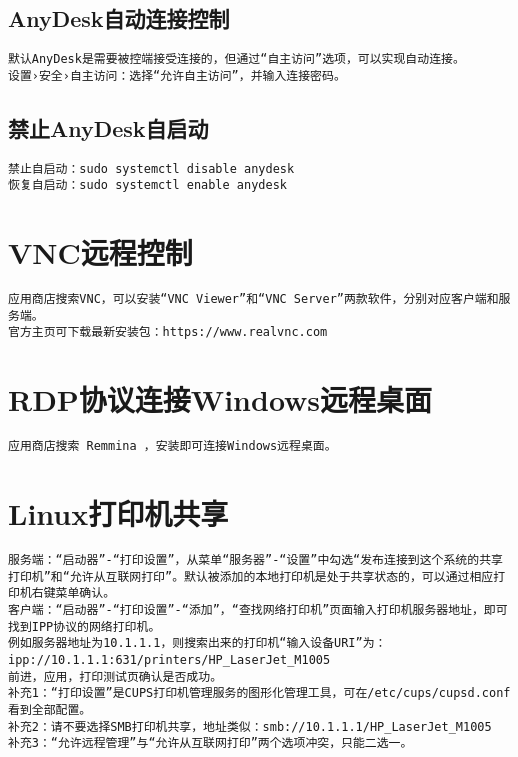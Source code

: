 \documentclass[a4paper,fontset=fandol,zihao=-4,linespread=1.2]{ctexbook}
\begin{document}
\subsection{AnyDesk自动连接控制}
\begin{lstlisting}
默认AnyDesk是需要被控端接受连接的，但通过“自主访问”选项，可以实现自动连接。
设置›安全›自主访问：选择“允许自主访问”，并输入连接密码。
\end{lstlisting}

\subsection{禁止AnyDesk自启动}
\begin{lstlisting}
禁止自启动：sudo systemctl disable anydesk
恢复自启动：sudo systemctl enable anydesk
\end{lstlisting}

\section{VNC远程控制}
\begin{lstlisting}
应用商店搜索VNC，可以安装“VNC Viewer”和“VNC Server”两款软件，分别对应客户端和服务端。
官方主页可下载最新安装包：https://www.realvnc.com
\end{lstlisting}

\section{RDP协议连接Windows远程桌面}
\begin{lstlisting}
应用商店搜索 Remmina ，安装即可连接Windows远程桌面。
\end{lstlisting}

\section{Linux打印机共享}
\begin{lstlisting}
服务端：“启动器”-“打印设置”，从菜单“服务器”-“设置”中勾选“发布连接到这个系统的共享打印机”和“允许从互联网打印”。默认被添加的本地打印机是处于共享状态的，可以通过相应打印机右键菜单确认。
客户端：“启动器”-“打印设置”-“添加”，“查找网络打印机”页面输入打印机服务器地址，即可找到IPP协议的网络打印机。
例如服务器地址为10.1.1.1，则搜索出来的打印机“输入设备URI”为：
ipp://10.1.1.1:631/printers/HP_LaserJet_M1005
前进，应用，打印测试页确认是否成功。
补充1：“打印设置”是CUPS打印机管理服务的图形化管理工具，可在/etc/cups/cupsd.conf看到全部配置。
补充2：请不要选择SMB打印机共享，地址类似：smb://10.1.1.1/HP_LaserJet_M1005
补充3：“允许远程管理”与“允许从互联网打印”两个选项冲突，只能二选一。
\end{lstlisting}
\end{document}
